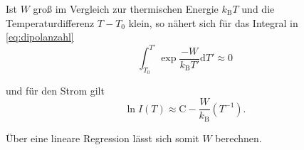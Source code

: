 Ist $W$ groß im Vergleich zur thermischen Energie $k_\text{B}T$ und die Temperaturdifferenz $T - T_0$ klein, so nähert sich für das Integral in \autoref{eq:dipolanzahl}
\begin{equation*}
    \int_{T_0}^{T'} \exp{\frac{-W}{k_\text{B}T'} \mathrm{d}}T' \approx 0
\end{equation*}

und für den Strom gilt
\begin{equation}
    \ln{I\left(T\right)} \approx \text{C} - \frac{W}{k_\text{B}} \left(T^{-1}\right).
\end{equation}

Über eine lineare Regression lässt sich somit $W$ berechnen. 